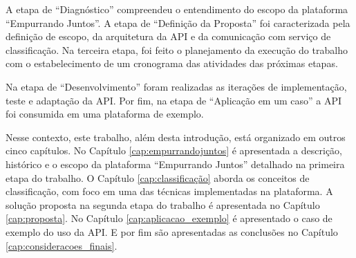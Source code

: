 A etapa de ``Diagnóstico'' compreendeu o entendimento do escopo da plataforma ``Empurrando Juntos''.
A etapa de ``Definição da Proposta'' foi caracterizada pela definição de escopo, 
da arquitetura da API e da comunicação com serviço de classificação. Na terceira etapa, 
foi feito o planejamento da execução do trabalho com o estabelecimento
de um cronograma das atividades das próximas etapas. 

Na etapa de ``Desenvolvimento'' foram realizadas as iterações de implementação, teste e adaptação da API. 
Por fim, na etapa de ``Aplicação em um caso'' a API foi consumida em uma plataforma de exemplo.

Nesse contexto, este trabalho, além desta introdução, está organizado em outros cinco capítulos.
No Capítulo \ref{cap:empurrandojuntos} é apresentada a descrição, histórico e o escopo da plataforma ``Empurrando Juntos'' 
detalhado na primeira etapa do trabalho.
O Capítulo \ref{cap:classificação} aborda os conceitos de classificação, com foco em uma das técnicas implementadas na plataforma. 
A solução proposta na segunda etapa do trabalho é apresentada no Capítulo \ref{cap:proposta}. No Capítulo \ref{cap:aplicacao_exemplo} é
apresentado o caso de exemplo do uso da API. E por fim são apresentadas as conclusões no Capítulo \ref{cap:consideracoes_finais}.
